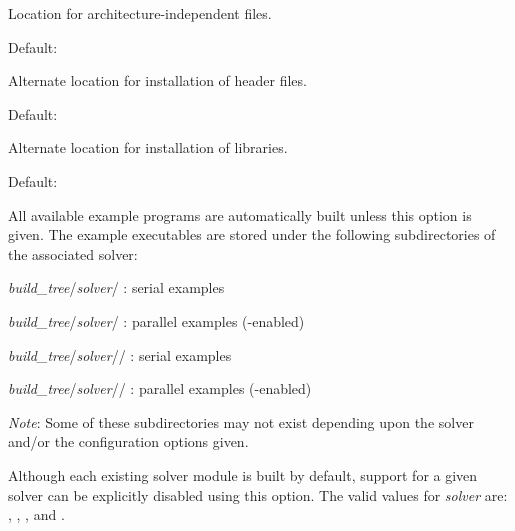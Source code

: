 \begin{config}
  
\item {}
  
  Location for architecture-independent files.
  
  Default: 
  
\item {}
  
  Alternate location for installation of header files.
  
  Default: 
  
\item {}
  
  Alternate location for installation of libraries.
  
  Default: 

\item {}
  
  All available example programs are automatically built unless this option is
  given. The example executables are stored under the following subdirectories
  of the associated solver: 
  
  \begin{config}
  \item {\em build\_tree}/{\em solver}/ : serial {\C} examples
  \item {\em build\_tree}/{\em solver}/ : parallel {\C} examples ({\mpi}-enabled)
  \item {\em build\_tree}/{\em solver}// : serial {\F} examples
  \item {\em build\_tree}/{\em solver}// : parallel {\F} examples ({\mpi}-enabled)
  \end{config}
  
  {\em Note}: Some of these subdirectories may not exist depending upon the
  solver and/or the configuration options given.
  
\item {}

  Although each existing solver module is built by default, support for a
  given solver can be explicitly disabled using this option. 
  The valid values for {\em solver} are: , , 
  , and .
  
\item {}


\end{config}

